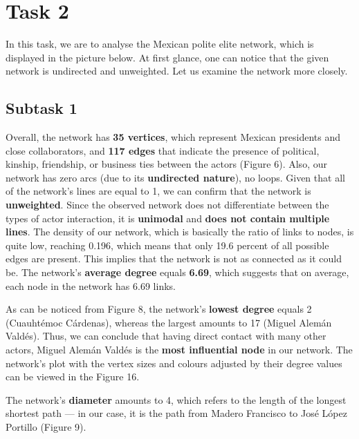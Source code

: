 \section{Task 2}
In this task, we are to analyse the Mexican polite elite network, which is displayed in the picture below. At first glance, one can notice that the given network is undirected and unweighted. Let us examine the network more closely.



\subsection{Subtask 1}
Overall, the network has \textbf{35 vertices}, which represent Mexican presidents and close collaborators, and \textbf{117 edges} that indicate the presence of political, kinship, friendship, or business ties between the actors (Figure 6). Also, our network has zero arcs (due to its \textbf{undirected nature}), no loops. Given that all of the network’s lines are equal to 1, we can confirm that the network is \textbf{unweighted}. Since the observed network does not differentiate between the types of actor interaction, it is \textbf{unimodal} and \textbf{does not contain multiple lines}. The density of our network, which is basically the ratio of links to nodes, is quite low, reaching 0.196, which means that only 19.6 percent of all possible edges are present. This implies that the network is not as connected as it could be. The network’s \textbf{average degree} equals \textbf{6.69}, which suggests that on average, each node in the network has 6.69 links.

\FloatBarrier


As can be noticed from Figure 8, the network’s \textbf{lowest degree} equals 2 (Cuauhtémoc Cárdenas), whereas the largest amounts to 17 (Miguel Alemán Valdés). Thus, we can conclude that having direct contact with many other actors, Miguel Alemán Valdés is the \textbf{most influential node} in our network. The network’s plot with the vertex sizes and colours adjusted by their degree values can be viewed in the Figure 16.


The network’s \textbf{diameter} amounts to 4, which refers to the length of the longest shortest path — in our case, it is the path from Madero Francisco to José López Portillo (Figure 9).

